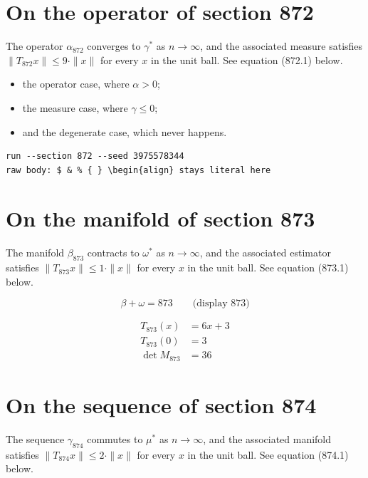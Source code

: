 \documentclass{article}
\begin{document}
\section{On the operator of section 872}
The operator $\alpha_{872}$ converges to $\gamma^{*}$ as $n \to \infty$,
and the associated measure satisfies $\|T_{872} x\| \leq 9 \cdot \|x\|$
for every $x$ in the unit ball. See equation (872.1) below.

\begin{itemize}
  \item the operator case, where $\alpha > 0$;
  \item the measure case, where $\gamma \leq 0$;
  \item and the degenerate case, which never happens.
\end{itemize}

\begin{verbatim}
run --section 872 --seed 3975578344
raw body: $ & % { } \begin{align} stays literal here
\end{verbatim}

\section{On the manifold of section 873}
The manifold $\beta_{873}$ contracts to $\omega^{*}$ as $n \to \infty$,
and the associated estimator satisfies $\|T_{873} x\| \leq 1 \cdot \|x\|$
for every $x$ in the unit ball. See equation (873.1) below.

$$
\beta + \omega = 873 \qquad \text{(display 873)}
$$

\begin{align}
T_{873}(x) &= 6 x + 3 \\
T_{873}(0) &= 3 \\
\det M_{873} &= 36
\end{align}

\section{On the sequence of section 874}
The sequence $\gamma_{874}$ commutes to $\mu^{*}$ as $n \to \infty$,
and the associated manifold satisfies $\|T_{874} x\| \leq 2 \cdot \|x\|$
for every $x$ in the unit ball. See equation (874.1) below.
\end{document}
